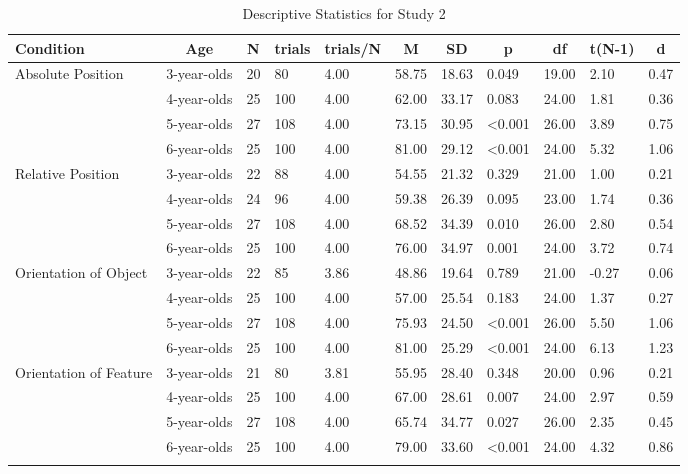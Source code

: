 \documentclass[
  man]{apa6}
\begin{document}
\begin{landscape}
\begin{table}[tbp]
\begin{center}
\begin{threeparttable}
\end{threeparttable}
\end{center}

\end{table}


\begin{table}[tbp]

\begin{center}
\begin{threeparttable}

\caption{\label{tab:s2_testtables}Descriptive Statistics for Study 2}

\begin{tabular}{lllllllllll}
\toprule
Condition & \multicolumn{1}{c}{Age} & \multicolumn{1}{c}{N} & \multicolumn{1}{c}{trials} & \multicolumn{1}{c}{trials/N} & \multicolumn{1}{c}{M} & \multicolumn{1}{c}{SD} & \multicolumn{1}{c}{p} & \multicolumn{1}{c}{df} & \multicolumn{1}{c}{t(N-1)} & \multicolumn{1}{c}{d}\\
\midrule
Absolute Position & 3-year-olds & 20 & 80 & 4.00 & 58.75 & 18.63 & 0.049 & 19.00 & 2.10 & 0.47\\
 & 4-year-olds & 25 & 100 & 4.00 & 62.00 & 33.17 & 0.083 & 24.00 & 1.81 & 0.36\\
 & 5-year-olds & 27 & 108 & 4.00 & 73.15 & 30.95 & <0.001 & 26.00 & 3.89 & 0.75\\
 & 6-year-olds & 25 & 100 & 4.00 & 81.00 & 29.12 & <0.001 & 24.00 & 5.32 & 1.06\\
Relative Position & 3-year-olds & 22 & 88 & 4.00 & 54.55 & 21.32 & 0.329 & 21.00 & 1.00 & 0.21\\
 & 4-year-olds & 24 & 96 & 4.00 & 59.38 & 26.39 & 0.095 & 23.00 & 1.74 & 0.36\\
 & 5-year-olds & 27 & 108 & 4.00 & 68.52 & 34.39 & 0.010 & 26.00 & 2.80 & 0.54\\
 & 6-year-olds & 25 & 100 & 4.00 & 76.00 & 34.97 & 0.001 & 24.00 & 3.72 & 0.74\\
Orientation of Object & 3-year-olds & 22 & 85 & 3.86 & 48.86 & 19.64 & 0.789 & 21.00 & -0.27 & 0.06\\
 & 4-year-olds & 25 & 100 & 4.00 & 57.00 & 25.54 & 0.183 & 24.00 & 1.37 & 0.27\\
 & 5-year-olds & 27 & 108 & 4.00 & 75.93 & 24.50 & <0.001 & 26.00 & 5.50 & 1.06\\
 & 6-year-olds & 25 & 100 & 4.00 & 81.00 & 25.29 & <0.001 & 24.00 & 6.13 & 1.23\\
Orientation of Feature & 3-year-olds & 21 & 80 & 3.81 & 55.95 & 28.40 & 0.348 & 20.00 & 0.96 & 0.21\\
 & 4-year-olds & 25 & 100 & 4.00 & 67.00 & 28.61 & 0.007 & 24.00 & 2.97 & 0.59\\
 & 5-year-olds & 27 & 108 & 4.00 & 65.74 & 34.77 & 0.027 & 26.00 & 2.35 & 0.45\\
 & 6-year-olds & 25 & 100 & 4.00 & 79.00 & 33.60 & <0.001 & 24.00 & 4.32 & 0.86\\
\bottomrule
\addlinespace
\end{tabular}


\end{threeparttable}
\end{center}
\end{table}
\end{landscape}
\end{document}
